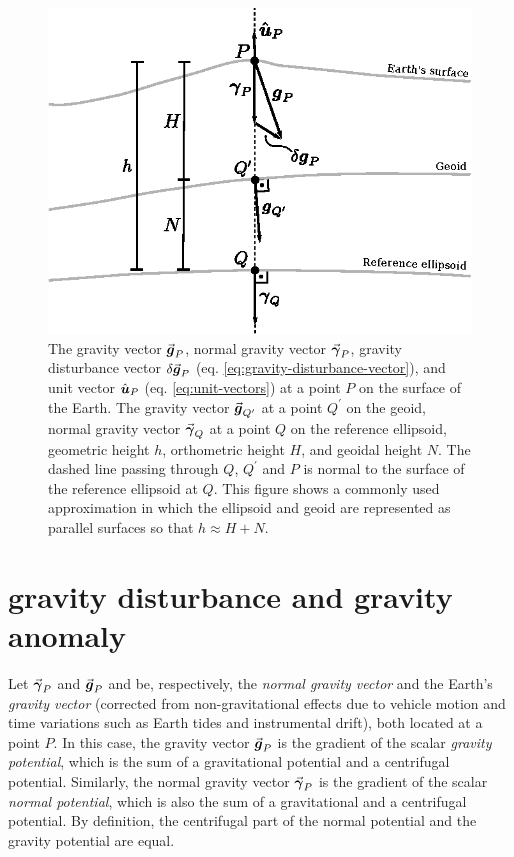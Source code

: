 \documentclass[extra]{gji}
\newcommand{\versor}[1]{\hat{\mitbf{#1}}}
\renewcommand{\vector}[1]{\vec{\mitbf{#1}}}
\begin{document}
\begin{figure}
    \includegraphics{figures/surfaces.eps}
    \caption{
    The gravity vector
    $\vector{g}_{P}$, normal gravity vector $\vector{\gamma}_{P}$,
    gravity disturbance vector $\delta \vector{g}_{P}$
    (eq. \ref{eq:gravity-disturbance-vector}), and unit vector
    $\versor{u}_{P}$ (eq. \ref{eq:unit-vectors}) at a point $P$
    on the surface of the Earth.
    The gravity vector $\vector{g}_{Q^{\prime}}$
    at a point $Q^{\prime}$ on the geoid, normal gravity vector
    $\vector{\gamma}_{Q}$ at a point $Q$ on the reference ellipsoid,
    geometric height $h$, orthometric height $H$, and geoidal height $N$.
    The dashed line passing through
    $Q$, $Q^{\prime}$ and $P$ is normal to the
    surface of the reference ellipsoid at $Q$.
    This figure shows a commonly used approximation in which the ellipsoid and
    geoid are represented as parallel surfaces so that $h \approx H + N$.
    }
  \label{fig:surfaces}
\end{figure}


\section{gravity disturbance and gravity anomaly}

Let $\vector{\gamma}_{P}$ and $\vector{g}_{P}$ and be, respectively,
the \textit{normal gravity vector} and the Earth's \textit{gravity vector}
(corrected from non-gravitational effects due to vehicle
motion and time variations such as Earth tides and instrumental drift),
both located at a point $P$.
In this case, the gravity vector $\vector{g}_{P}$ is the
gradient of the scalar \textit{gravity potential},
which is the sum of a gravitational potential and a centrifugal potential.
Similarly, the normal gravity vector $\vector{\gamma}_{P}$ is the
gradient of the scalar \textit{normal potential},
which is also the sum of a gravitational and a centrifugal potential.
By definition, the centrifugal part of
the normal potential and the gravity potential are equal.
\end{document}
